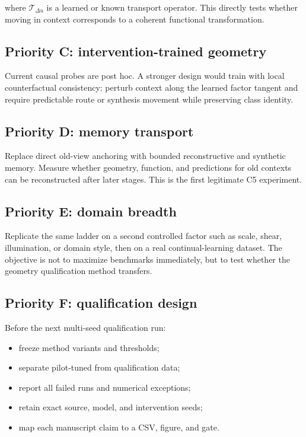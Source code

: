 \documentclass[11pt,a4paper]{article}
\begin{document}
where $\mathcal{T}_{\Delta u}$ is a learned or known transport operator. This directly tests whether moving in context corresponds to a coherent functional transformation.

\subsection{Priority C: intervention-trained geometry}

Current causal probes are post hoc. A stronger design would train with local counterfactual consistency: perturb context along the learned factor tangent and require predictable route or synthesis movement while preserving class identity.

\subsection{Priority D: memory transport}

Replace direct old-view anchoring with bounded reconstructive and synthetic memory. Measure whether geometry, function, and predictions for old contexts can be reconstructed after later stages. This is the first legitimate C5 experiment.

\subsection{Priority E: domain breadth}

Replicate the same ladder on a second controlled factor such as scale, shear, illumination, or domain style, then on a real continual-learning dataset. The objective is not to maximize benchmarks immediately, but to test whether the geometry qualification method transfers.

\subsection{Priority F: qualification design}

Before the next multi-seed qualification run:

\begin{itemize}
\item freeze method variants and thresholds;
\item separate pilot-tuned from qualification data;
\item report all failed runs and numerical exceptions;
\item retain exact source, model, and intervention seeds;
\item map each manuscript claim to a CSV, figure, and gate.
\end{itemize}
\end{document}
